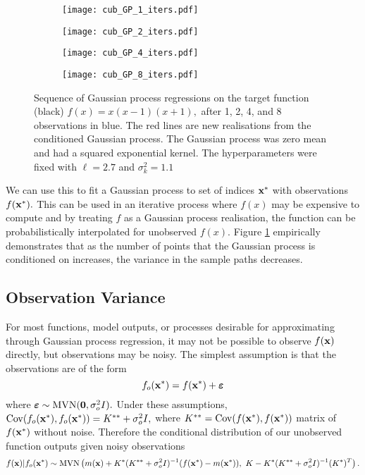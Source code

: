 \begin{figure}[htbp]
    \centering
    \begin{subfigure}[b]{0.5\textwidth}
        \centering
        \texttt{[image: cub\_GP\_1\_iters.pdf]}
    \end{subfigure}%
    \hfill%
    \begin{subfigure}[b]{0.5\textwidth}
        \centering
        \texttt{[image: cub\_GP\_2\_iters.pdf]}
    \end{subfigure}
    \begin{subfigure}[b]{0.5\textwidth}
        \centering
        \texttt{[image: cub\_GP\_4\_iters.pdf]}
    \end{subfigure}%
    \hfill%
    \begin{subfigure}[b]{0.5\textwidth}
        \centering
        \texttt{[image: cub\_GP\_8\_iters.pdf]}
    \end{subfigure}%
    \caption{
        Sequence of Gaussian process regressions on the target function
        (black) $f(x) = x(x-1)(x+1),$ after 1, 2, 4, and 8 observations in
        blue. The red lines are new realisations from the conditioned Gaussian
        process. The Gaussian process was zero mean and had a squared
        exponential kernel. The hyperparameters were fixed with $\ell = 2.7$
        and $\sigma^2_k = 1.1$
    }
    \label{fig:no_var_cub_reg}
\end{figure}

We can use this to fit a Gaussian process to set of indices $\mathbf{x}^\ast$ with
observations $f(\mathbf{x}^\ast).$
This can be used in an iterative process where $f(x)$
may be expensive to compute and by treating $f$ as a Gaussian process
realisation, the function can be probabilistically interpolated for unobserved
$f(x).$ Figure \ref{fig:no_var_cub_reg} empirically demonstrates that as
the number of points that the Gaussian process is conditioned on increases, 
the variance in the sample paths decreases.

\subsection*{Observation Variance}

For most functions, model outputs, or processes desirable for
approximating through Gaussian process regression, it may not be possible to
observe $f(\mathbf{x})$ directly, but observations may be noisy.
The simplest assumption is that the
observations are of the form
$$
    f_o(\mathbf{x}^\ast) = f(\mathbf{x}^\ast) + \bm{\varepsilon}
$$
where $\bm{\varepsilon} \sim \operatorname{MVN}(\mathbf{0}, \sigma^2_o I).$
Under these assumptions,
$\mathrm{Cov}(f_o(\mathbf{x}^\ast), f_o(\mathbf{x}^\ast)) = K^{**} + \sigma^2_o I,$
where $K^{**} = \mathrm{Cov}(f(\mathbf{x}^\ast), f(\mathbf{x}^\ast))$
matrix of $f(\mathbf{x}^\ast)$ without noise. Therefore the conditional
distribution of our unobserved function outputs given noisy observations
$$
    f(\mathbf{x}) | f_o(\mathbf{x}^\ast)
    \sim \operatorname{MVN}\left(
    m(\mathbf{x}) + K^{\ast}
    (K^{**} + \sigma^2_o I)^{-1}
    (f(\mathbf{x}^\ast) - m(\mathbf{x}^\ast)), \,\,
    K - K^{\ast}(K^{**} + \sigma^2_o I)^{-1}(K^{\ast})^T
    \right).
$$


